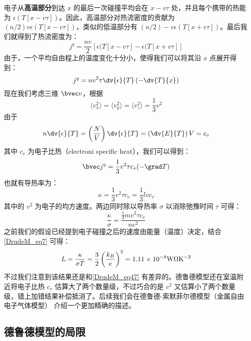 电子从\textbf{高温部分}到达 $x$ 的最后一次碰撞平均会在 $x-v\tau$ 处，并且每个携带的热能为 $\epsilon(T[x-v\tau])$。因此，高温部分对热流密度的贡献为 $(n/2)v\epsilon(T[x-v\tau])$，类似的低温部分有 $(n/2)-v\epsilon(T[x+v\tau])$。最后我们就得到了热流密度为：
\begin{equation}
j^q = \frac{nv}{2}[\epsilon(T[x-v\tau]-\epsilon(T[x+v\tau]]
\end{equation}
由于，一个平均自由程上的温度变化十分小，使得我们可以将其沿 $x$ 点展开得到：
\begin{equation}
j^q = nv^2\tau\dv{\epsilon}{T}\left(-\dv{T}{x}\right)
\end{equation}
现在我们考虑三维 $\bvec v$，根据
\begin{equation}
\langle v_x^2\rangle = \langle v_y^2\rangle=\langle v_z^2 \rangle = \frac{1}{3}v^2
\end{equation}
由于
\begin{equation}
n\dv{\epsilon}{T}=\left(\frac{N}{V}\right)\dv{\epsilon}{T}=\left(\dv{E}{T}\right)V=c_v
\end{equation}
其中 $c_v$ 为电子比热（electroni specific heat），我们可以得到：
\begin{equation}
\bvec j^q =\frac{1}{3}v^2\tau c_v(-\grad T)
\end{equation}
也就有导热率为：
\begin{equation}
\kappa=\frac{1}{3}v^2\tau c_v =\frac{1}{3}lvc_v
\end{equation}
其中的 $v^2$ 为电子的均方速度。两边同时除以导热率 $\sigma$ 以消除弛豫时间 $\tau$ 可得：
\begin{equation}
\frac{\kappa}{\sigma}=\frac{\frac{1}{3}mv^2\tau c_v}{ne^2}
\end{equation}
之前我们的假设已经提到电子碰撞之后的速度由能量（温度）决定，结合\autoref{DrudeM_eq7} 可得：
\begin{equation}
L=\frac{\kappa}{\sigma T}=\frac{3}{2}\left(\frac{k_B}{e}\right)^2 = 1.11\times10^{-8}\rm{W\Omega K^{-2}}
\end{equation}
不过我们注意到该结果还是和\autoref{DrudeM_eq47} 有差异的。德鲁德模型还在室温附近将电子比热 $c_v$ 估算大了两个数量级，不过巧合的是 $v^2$ 又估算小了两个数量级，错上加错结果补偿抵消了。后续我们会在德鲁德-索默菲尔德模型（金属自由电子气体模型）%
介绍一个更加精确的描述。

\subsection{德鲁德模型的局限}

